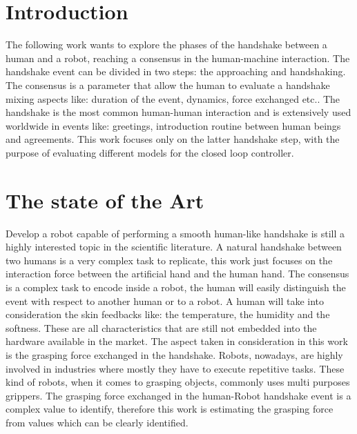 \chapter*{Introduction}
The following work wants to explore the phases of the handshake between a human and a robot, reaching a consensus in the human-machine interaction. The handshake event can be divided in two steps: the approaching and handshaking. The consensus is a parameter that allow the human to evaluate a handshake mixing aspects like: duration of the event, dynamics, force exchanged etc.. 
The handshake is the most common human-human interaction and is extensively used worldwide in events like: greetings, introduction routine between human beings and agreements. 
This work focuses only on the latter handshake step, with the purpose of evaluating different models for the closed loop controller. 


\chapter{The state of the Art}
Develop a robot capable of performing a smooth human-like handshake is still a highly interested topic in the scientific literature.
A natural handshake between two humans is a very complex task to replicate, this work just focuses on the interaction force between the artificial hand and the human hand.
The consensus is a complex task to encode inside a robot, the human will easily distinguish the event with respect to another human or to a robot. A human will take into consideration the skin feedbacks like: the temperature, the humidity and the softness. These are all characteristics that are still not embedded into the hardware available in the market. The aspect taken in consideration in this work is the grasping force exchanged in the handshake. 
Robots, nowadays, are highly involved in industries where mostly they have to execute repetitive tasks. These kind of robots, when it comes to grasping objects, commonly uses multi purposes grippers\cite{multipurposegripper}. The grasping force exchanged in the human-Robot handshake event is a complex value to identify, therefore this work is estimating the grasping force from values which can be clearly identified. 


\cite{facialexpressions}
\cite{espen}
\cite{mirrorgame}
\cite{papageorgiou}

